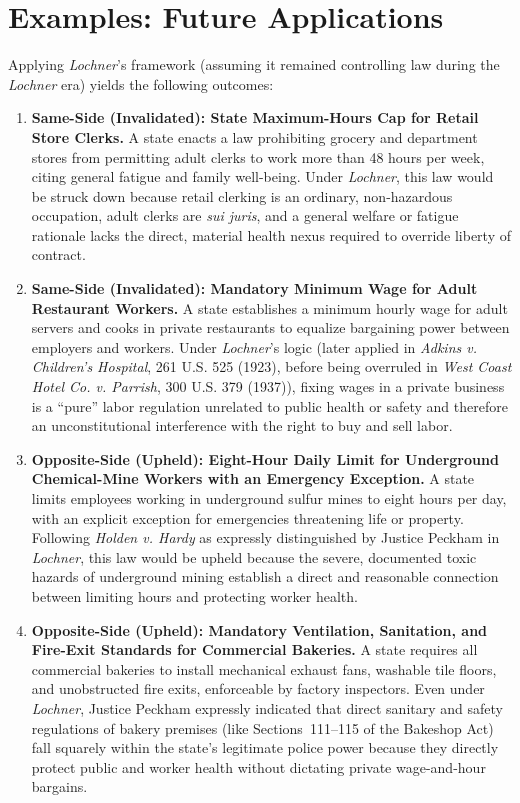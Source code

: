 \documentclass[12pt]{article}
\begin{document}
\section{Examples: Future Applications}

Applying \textit{Lochner}'s framework (assuming it remained controlling law during the \textit{Lochner} era) yields the following outcomes:

\begin{enumerate}
    \item \textbf{Same-Side (Invalidated): State Maximum-Hours Cap for Retail Store Clerks.} A state enacts a law prohibiting grocery and department stores from permitting adult clerks to work more than 48 hours per week, citing general fatigue and family well-being. Under \textit{Lochner}, this law would be struck down because retail clerking is an ordinary, non-hazardous occupation, adult clerks are \textit{sui juris}, and a general welfare or fatigue rationale lacks the direct, material health nexus required to override liberty of contract.

    \item \textbf{Same-Side (Invalidated): Mandatory Minimum Wage for Adult Restaurant Workers.} A state establishes a minimum hourly wage for adult servers and cooks in private restaurants to equalize bargaining power between employers and workers. Under \textit{Lochner}'s logic (later applied in \textit{Adkins v. Children's Hospital}, 261 U.S. 525 (1923), before being overruled in \textit{West Coast Hotel Co. v. Parrish}, 300 U.S. 379 (1937)), fixing wages in a private business is a ``pure'' labor regulation unrelated to public health or safety and therefore an unconstitutional interference with the right to buy and sell labor.

    \item \textbf{Opposite-Side (Upheld): Eight-Hour Daily Limit for Underground Chemical-Mine Workers with an Emergency Exception.} A state limits employees working in underground sulfur mines to eight hours per day, with an explicit exception for emergencies threatening life or property. Following \textit{Holden v. Hardy} as expressly distinguished by Justice Peckham in \textit{Lochner}, this law would be upheld because the severe, documented toxic hazards of underground mining establish a direct and reasonable connection between limiting hours and protecting worker health.

    \item \textbf{Opposite-Side (Upheld): Mandatory Ventilation, Sanitation, and Fire-Exit Standards for Commercial Bakeries.} A state requires all commercial bakeries to install mechanical exhaust fans, washable tile floors, and unobstructed fire exits, enforceable by factory inspectors. Even under \textit{Lochner}, Justice Peckham expressly indicated that direct sanitary and safety regulations of bakery premises (like Sections~111--115 of the Bakeshop Act) fall squarely within the state's legitimate police power because they directly protect public and worker health without dictating private wage-and-hour bargains.


\end{enumerate}
\end{document}
